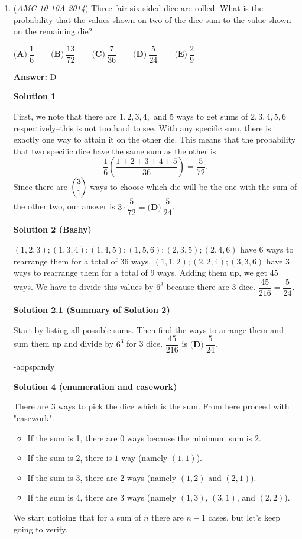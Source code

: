 \begin{enumerate}
 


	\item (\textit{AMC 10 10A 2014}) Three fair six-sided dice are rolled. What is the probability that the values shown on two of the dice sum to the value shown on the remaining die?


 $\textbf{(A)}\ \dfrac16\qquad\textbf{(B)}\ \dfrac{13}{72}\qquad\textbf{(C)}\ \dfrac7{36}\qquad\textbf{(D)}\ \dfrac5{24}\qquad\textbf{(E)}\ \dfrac29$

 \textbf{Answer: }D



\textbf{Solution 1}

First, we note that there are $1, 2, 3, 4,$ and $5$ ways to get sums of $2, 3, 4, 5, 6$ respectively--this is not too hard to see. With any specific sum, there is exactly one way to attain it on the other die. This means that the probability that two specific dice have the same sum as the other is 
 \[\dfrac16 \left( \dfrac{1+2+3+4+5}{36}\right) = \dfrac{5}{72}.\] Since there are $\dbinom31$ ways to choose which die will be the one with the sum of the other two, our answer is $3 \cdot \dfrac{5}{72} = \boxed{\textbf{(D)} \: \dfrac{5}{24}}$.

 



\textbf{Solution 2 (Bashy)}

$(1, 2, 3); (1, 3, 4); (1, 4, 5); (1, 5, 6); (2, 3, 5); (2, 4, 6)$ have $6$ ways to rearrange them for a total of $36$ ways. $(1, 1, 2); (2, 2, 4); (3, 3, 6)$ have $3$ ways to rearrange them for a total of $9$ ways. Adding them up, we get $45$ ways. We have to divide this values by $6^3$ because there are 3 dice. $\dfrac{45}{216}=\boxed{\dfrac{5}{24}}$.

 



\textbf{Solution 2.1 (Summary of Solution 2)}

Start by listing all possible sums. Then find the ways to arrange them and sum them up and divide by $6^3$ for 3 dice. $\dfrac{45}{216}$ is $\boxed{\textbf{(D)} \: \dfrac{5}{24}}$.

 -aopspandy

 



\textbf{Solution 4 (enumeration and casework)}

There are $3$ ways to pick the dice which is the sum. From here proceed with "casework":

 
            \begin{itemize}
        \item If the sum is 1, there are $0$ ways because the minimum sum is $2$.
        \item If the sum is 2, there is $1$ way (namely $(1, 1)$).
        \item If the sum is 3, there are $2$ ways (namely $(1, 2)$ and $(2, 1)$).
        \item If the sum is 4, there are $3$ ways (namely $(1, 3)$, $(3, 1)$, and $(2, 2)$).
            \end{itemize}
            We start noticing that for a sum of $n$ there are $n-1$ cases, but let's keep going to verify.


\end{enumerate}
